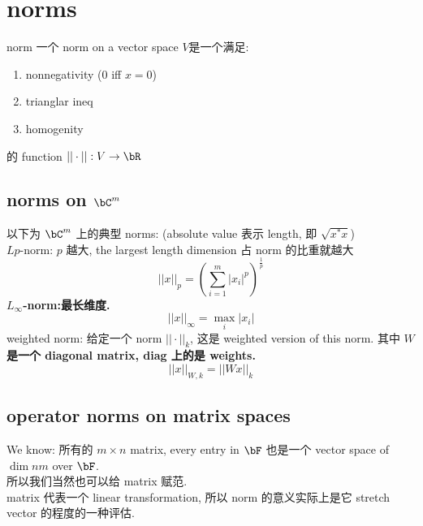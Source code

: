 \chapter{norms}

\begin{definition}{norm}
一个 norm on a vector space $V$是一个满足:
\begin{enumerate}
    \item nonnegativity (0 iff $x=0$)
    \item trianglar ineq
    \item homogenity
\end{enumerate}
的 function $||\cdot||:V \rar \bR$
\end{definition}


\section{norms on $\bC^m$}
\begin{example}
以下为 $\bC^m$ 上的典型 norms: (absolute value 表示 length, 即 $\sqrt{x^*x}$) \\
$Lp$-norm: $p$ 越大, the largest length dimension 占 norm 的比重就越大
$$
    ||x||_p = (\sum_{i=1}^m |x_i|^p)^{\frac{1}{p}}
$$
\textbf{$L_\infty$-norm:最长维度.}$$
    ||x||_\infty = \max_i |x_i|
    $$
weighted norm: 给定一个 norm $||\cdot||_k$, 这是 weighted version of this norm. 其中 \textbf{$W$ 是一个 diagonal matrix, diag 上的是 weights.}
$$
||x||_{W,k}= ||Wx||_{k}
$$
\end{example}





\section{operator norms on matrix spaces}

We know: 所有的 $m \times n$ matrix, every entry in $\bF$ 也是一个 vector space of $\dim nm$ over $\bF$.\\
所以我们当然也可以给 matrix 赋范.\\
matrix 代表一个 linear transformation, 所以 norm 的意义实际上是它 stretch vector 的程度的一种评估.

